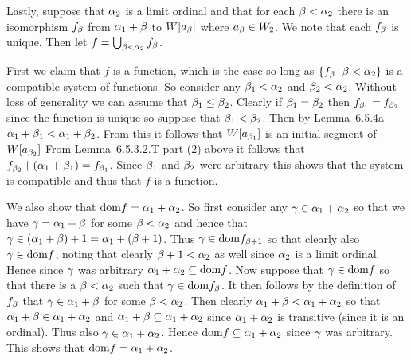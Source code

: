 \begin{questions}
\begin{solution}
    Lastly, suppose that $\alpha_2$ is a limit ordinal and that for each $\beta < \alpha_2$ there is an isomorphism $f_\beta$ from $\alpha_1 + \beta$ to $W[a_\beta]$ where $a_\beta \in W_2$.
    We note that each $f_\beta$ is unique.
    Then let $f = \bigcup_{\beta < \alpha_2} f_\beta$.

    First we claim that $f$ is a function, which is the case so long as $\left\{ f_\beta \,|\, \beta < \alpha_2 \right\}$ is a compatible system of functions.
    So consider any $\beta_1 < \alpha_2$ and $\beta_2 < \alpha_2$.
    Without loss of generality we can assume that $\beta_1 \leq \beta_2$.
    Clearly if $\beta_1 = \beta_2$ then $f_{\beta_1} = f_{\beta_2}$ since the function is unique so suppose that $\beta_1 < \beta_2$.
    Then by Lemma~6.5.4a $\alpha_1 + \beta_1 < \alpha_1 + \beta_2$.
    From this it follows that $W[a_{\beta_1}]$ is an initial segment of $W[a_{\beta_2}]$
    From Lemma~6.5.3.2.T part (2) above it follows that $f_{\beta_2} \restriction (\alpha_1 + \beta_1) = f_{\beta_1}$.
    Since $\beta_1$ and $\beta_2$ were arbitrary this shows that the system is compatible and thus that $f$ is a function.

    We also show that  $\mathrm{dom} f = \alpha_1 + \alpha_2$.
    So first consider any $\gamma \in \alpha_1 + \alpha_2$ so that we have $\gamma = \alpha_1 + \beta$ for some $\beta < \alpha_2$ and hence that $\gamma \in (\alpha_1 + \beta) + 1 = \alpha_1 + (\beta + 1)$.
    Thus $\gamma \in \mathrm{dom} f_{\beta+1}$ so that clearly also $\gamma \in \mathrm{dom} f$, noting that clearly $\beta+1 < \alpha_2$ as well since $\alpha_2$ is a limit ordinal.
    Hence since $\gamma$ was arbitrary $\alpha_1 + \alpha_2 \subseteq \mathrm{dom} f$.
    Now suppose that $\gamma \in \mathrm{dom} f$ so that there is a $\beta < \alpha_2$ such that $\gamma \in \mathrm{dom} f_\beta$.
    It then follows by the definition of $f_\beta$ that $\gamma \in \alpha_1 + \beta$ for some $\beta < \alpha_2$.
    Then clearly $\alpha_1 + \beta < \alpha_1 + \alpha_2$ so that $\alpha_1 + \beta \in \alpha_1 + \alpha_2$ and $\alpha_1 + \beta \subseteq \alpha_1 + \alpha_2$ since $\alpha_1 + \alpha_2$ is transitive (since it is an ordinal).
    Thus also $\gamma \in \alpha_1 + \alpha_2$.
    Hence $\mathrm{dom} f \subseteq \alpha_1 + \alpha_2$ since $\gamma$ was arbitrary.
    This shows that $\mathrm{dom} f = \alpha_1 + \alpha_2$.


\end{solution}
\end{questions}

